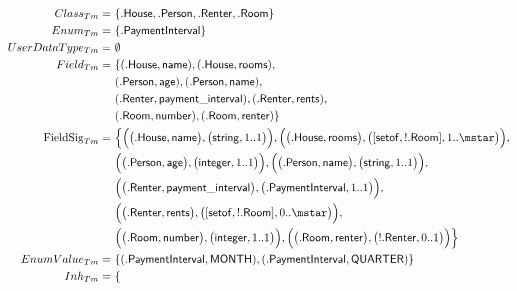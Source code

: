 \begin{figure}[p]
    \begin{subfigure}{\textwidth}
        \centering
        \begin{align*}
            Class_{Tm} =\ & \{ 
                .\type{House}, 
                .\type{Person}, 
                .\type{Renter}, 
                .\type{Room} 
            \}\\
            Enum_{Tm} =\ & \{ 
                .\type{PaymentInterval} 
            \}\\
            UserDataType_{Tm} =\ & \emptyset\\
            Field_{Tm} =\ & \{ 
                ( .\type{House}, \type{name} ),
                ( .\type{House}, \type{rooms} ),\\&
                ( .\type{Person}, \type{age} ), 
                ( .\type{Person}, \type{name} ),\\&
                ( .\type{Renter}, \type{payment\_interval} ),
                ( .\type{Renter}, \type{rents} ),\\&
                ( .\type{Room}, \type{number} ),
                ( .\type{Room}, \type{renter} )
            \}\\
            \mathrm{FieldSig}_{Tm} =\ & \Big\{ 
                \Big( \big( .\type{House}, \type{name} \big), \big( \type{string}, 1..1 \big) \Big),
                \Big( \big( .\type{House}, \type{rooms} \big), \big( [ \type{setof},  !.\type{Room} ], 1..\mstar \big) \Big),\\&
                \Big( \big( .\type{Person}, \type{age} \big), \big( \type{integer}, 1..1 \big) \Big), 
                \Big( \big( .\type{Person}, \type{name} \big), \big( \type{string}, 1..1 \big) \Big),\\&
                \Big( \big( .\type{Renter}, \type{payment\_interval} \big), \big( .\type{PaymentInterval}, 1..1 \big) \Big),\\&
                \Big( \big( .\type{Renter}, \type{rents} \big), \big( [ \type{setof}, !.\type{Room} ], 0..\mstar \big) \Big),\\&
                \Big( \big( .\type{Room}, \type{number} \big), \big( \type{integer}, 1..1 \big) \Big),
                \Big( \big( .\type{Room}, \type{renter} \big), \big( !.\type{Renter}, 0..1 \big) \Big)
            \Big\}\\
            EnumValue_{Tm} =\ & \{ 
                ( .\type{PaymentInterval}, \type{MONTH} ),
                ( .\type{PaymentInterval}, \type{QUARTER} )
            \}\\
            Inh_{Tm} =\ & \{ 

\end{align*}
\end{subfigure}
\end{figure}
